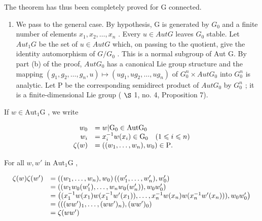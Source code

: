 The theorem has thus been completely proved for G connected.

\begin{enumerate}
\def\labelenumi{(\alph{enumi})}
\setcounter{enumi}{2}
\tightlist
\item
  We pass to the general case. By hypothesis, G is generated by \(G_{0}\) and a finite number of elements \(x_{1}, x_{2}, \ldots, x_{n}\) . Every \(u \in AutG\) leaves \(G_{0}\) stable. Let \(Aut_{1}G\) be the set of \(u \in AutG\) which, on passing to the quotient, give the identity automorphism of \(G/G_{0}\) . This is a normal subgroup of Aut G. By part (b) of the proof, \(AutG_{0}\) has a canonical Lie group structure and the mapping \((g_{1}, g_{2}, \ldots, g_{n}, u) \mapsto (ug_{1}, ug_{2}, \ldots, ug_{n})\) of \(G_{0}^{n} \times AutG_{0}\) into \(G_{0}^{n}\) is analytic. Let P be the corresponding semidirect product of \(AutG_{0}\) by \(G_{0}^{n}\) ; it is a finite-dimensional Lie group ( \(\S\) 1, no. 4, Proposition 7).
\end{enumerate}

If \(w\in \mathrm{Aut}_1\mathrm{G}\) , we write

\[
\begin{array}{r l} w _ {0} & = w | \mathrm{G} _ {0} \in \mathrm{Aut}   \mathrm{G} _ {0} \\ w _ {i} & = x _ {i} ^ {- 1} w (x _ {i}) \in \mathrm{G} _ {0} \quad (1 \leqslant i \leqslant n) \\ \zeta (w) & = ((w _ {1}, \ldots , w _ {n}), w _ {0}) \in \mathrm{P}. \end{array}
\]

For all \(w, w'\) in \(\mathrm{Aut}_1\mathrm{G}\) ,

\[
\begin{array}{r l} \zeta (w) \zeta (w ^ {\prime}) & = \left((w _ {1}, \ldots , w _ {n}), w _ {0}\right) \left((w _ {1} ^ {\prime}, \ldots , w _ {n} ^ {\prime}), w _ {0} ^ {\prime}\right) \\ & = \left((w _ {1} w _ {0} (w _ {1} ^ {\prime}), \ldots , w _ {n} w _ {0} (w _ {n} ^ {\prime})), w _ {0} w _ {0} ^ {\prime}\right) \\ & = \left((x _ {1} ^ {- 1} w (x _ {1}) w (x _ {1} ^ {- 1} w ^ {\prime} (x _ {1})), \ldots , x _ {n} ^ {- 1} w (x _ {n}) w (x _ {n} ^ {- 1} w ^ {\prime} (x _ {n}))), w _ {0} w _ {0} ^ {\prime}\right) \\ & = \left(((w w ^ {\prime}) _ {1}, \ldots , (w w ^ {\prime}) _ {n}), (w w ^ {\prime}) _ {0}\right) \\ & = \zeta (w w ^ {\prime}) \end{array}
\]

